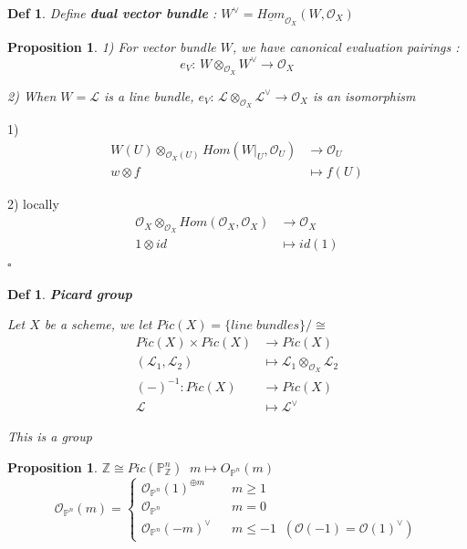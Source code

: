 \documentclass{article}
\newtheorem{definition}[theorem]{Def}
\newtheorem{proposition}[theorem]{Proposition}
\newenvironment{Proof}{{\noindent \indent \it Proof:\quad}}{\hfill $\square$\par}
\begin{document}
\begin{definition}
    Define \textbf{dual vector bundle} : $W^\vee=\underline{Hom}_{\mathcal O_X}(W,\mathcal O_X)$
\end{definition}

\begin{proposition}
    1) For vector bundle $W$, we have canonical evaluation pairings : $$e_V:\,W\otimes_{\mathcal O_X}W^\vee\to\mathcal O_X$$

    2) When $W=\mathcal L$ is a line bundle, $e_V:\,\mathcal L\otimes_{\mathcal O_X}\mathcal L^\vee\to\mathcal O_X$ is an isomorphism
\end{proposition}
\begin{Proof}
    1) 
\begin{align*}
\label{sup}
W(U)\otimes_{\mathcal O_X(U)}Hom(W|_U,\mathcal O_U)&\to\mathcal O_U\\
w\otimes f&\mapsto f(U)
 \end{align*}

2) locally
\begin{align*}
\label{sup}
\mathcal O_X\otimes_{\mathcal O_X}Hom(\mathcal O_X,\mathcal O_X)&\to\mathcal O_X\\
1\otimes id&\mapsto id(1)
 \end{align*}
\end{Proof}

\begin{definition}
    \textbf{Picard group}

    Let $X$ be a scheme, we let $Pic(X)=\{line\;bundles\}/\cong$
\begin{align*}
\label{sup}
Pic(X)\times Pic(X)&\to Pic(X)\\
(\mathcal L_1,\mathcal L_2)&\mapsto \mathcal L_1\otimes_{\mathcal O_X}\mathcal L_2\\
(-)^{-1}:Pic(X)&\to Pic(X)\\
\mathcal L&\mapsto \mathcal L^\vee
\end{align*}    

    This is a group
\end{definition}

\begin{proposition}
    $\mathbb Z\cong Pic(\mathbb P_{\mathbb Z}^n) \;\; m \mapsto O_{\mathbb P^n}(m)$
$$ 
\mathcal O_{\mathbb P^n}(m)=\left\{
\begin{array}{rcl}
\mathcal O_{\mathbb P^n}(1)^{\oplus m}       &      & m\geq 1\\
\mathcal O_{\mathbb P^n}     &      &  m=0\\
\mathcal O_{\mathbb P^n}(-m)^{\vee}  &  & m\leq -1\;\;(\mathcal O(-1)=\mathcal O(1)^\vee)
\end{array} \right.
$$
\end{proposition}
\end{document}
